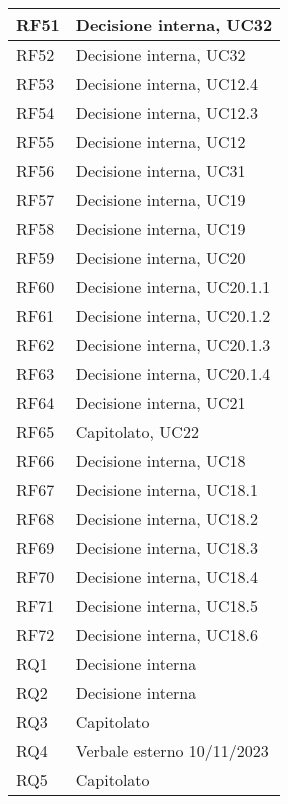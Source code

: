 \begin{center}
\begin{longtable}{|C{5cm}|C{5cm}|}
        \hline
        RF51 & Decisione interna, UC32 \\
        \hline
        RF52 & Decisione interna, UC32 \\
        \hline
        RF53 & Decisione interna, UC12.4 \\
        \hline
        RF54 & Decisione interna, UC12.3 \\
        \hline
        RF55 & Decisione interna, UC12 \\
        \hline
        RF56 & Decisione interna, UC31 \\
        \hline
        RF57 & Decisione interna, UC19 \\
        \hline
        RF58 & Decisione interna, UC19 \\
        \hline
        RF59 & Decisione interna, UC20 \\
        \hline
        RF60 & Decisione interna, UC20.1.1 \\
        \hline
        RF61 & Decisione interna, UC20.1.2 \\
        \hline
        RF62 & Decisione interna, UC20.1.3 \\
        \hline
        RF63 & Decisione interna, UC20.1.4 \\
        \hline
        RF64 & Decisione interna, UC21 \\
        \hline
        RF65 & Capitolato, UC22 \\
        \hline
        RF66 & Decisione interna, UC18 \\
        \hline
        RF67 & Decisione interna, UC18.1 \\
        \hline
        RF68 & Decisione interna, UC18.2 \\
        \hline
        RF69 & Decisione interna, UC18.3 \\
        \hline
        RF70 & Decisione interna, UC18.4 \\
        \hline
        RF71 & Decisione interna, UC18.5 \\
        \hline
        RF72 & Decisione interna, UC18.6 \\
        \hline
        \hline
        RQ1 & Decisione interna \\
        \hline
        RQ2 & Decisione interna \\
        \hline
        RQ3 & Capitolato \\
        \hline
        RQ4 & Verbale esterno 10/11/2023 \\
        \hline
        RQ5 & Capitolato \\

\end{longtable}
\end{center}
